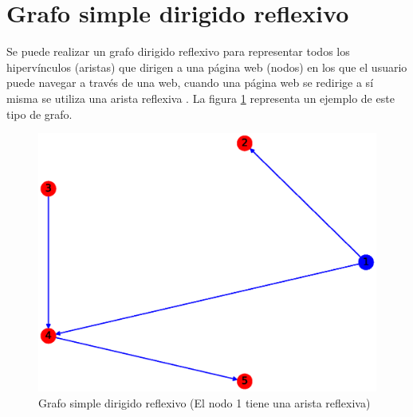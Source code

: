 \documentclass{article}
\begin{document}
\section{Grafo simple dirigido reflexivo}
Se  puede realizar un grafo dirigido reflexivo para representar todos los hipervínculos (aristas) que dirigen a una página web (nodos) en los que el usuario puede navegar a través de una web, cuando una página web se redirige a sí misma se utiliza una arista reflexiva \cite{GSDA}. La figura \ref{fig:GSDR} representa un ejemplo de este tipo de grafo.
\begin{figure}[H]
    \includegraphics[width=\textwidth]{6-GSDR}
    \caption{Grafo simple dirigido reflexivo (El nodo 1 tiene una arista reflexiva)}
    \label{fig:GSDR}
\end{figure}



\end{document}
